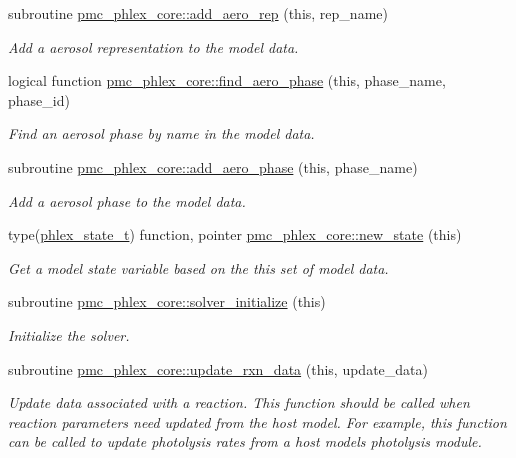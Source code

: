 \begin{DoxyCompactItemize}
subroutine \mbox{\hyperlink{namespacepmc__phlex__core_a7f01e1349e2d9387d646b46a676dcb78}{pmc\+\_\+phlex\+\_\+core\+::add\+\_\+aero\+\_\+rep}} (this, rep\+\_\+name)
\begin{DoxyCompactList}\small\item\em Add a aerosol representation to the model data. \end{DoxyCompactList}\item 
logical function \mbox{\hyperlink{namespacepmc__phlex__core_a3405caf8619aee5c8c8b485a7c4656c7}{pmc\+\_\+phlex\+\_\+core\+::find\+\_\+aero\+\_\+phase}} (this, phase\+\_\+name, phase\+\_\+id)
\begin{DoxyCompactList}\small\item\em Find an aerosol phase by name in the model data. \end{DoxyCompactList}\item 
subroutine \mbox{\hyperlink{namespacepmc__phlex__core_a0451072e828ba667d94da371f6651304}{pmc\+\_\+phlex\+\_\+core\+::add\+\_\+aero\+\_\+phase}} (this, phase\+\_\+name)
\begin{DoxyCompactList}\small\item\em Add a aerosol phase to the model data. \end{DoxyCompactList}\item 
type(\mbox{\hyperlink{structpmc__phlex__state_1_1phlex__state__t}{phlex\+\_\+state\+\_\+t}}) function, pointer \mbox{\hyperlink{namespacepmc__phlex__core_adffeba53035ef5016b6882ced639d412}{pmc\+\_\+phlex\+\_\+core\+::new\+\_\+state}} (this)
\begin{DoxyCompactList}\small\item\em Get a model state variable based on the this set of model data. \end{DoxyCompactList}\item 
subroutine \mbox{\hyperlink{namespacepmc__phlex__core_a9806ba5a2c2fec22d524fc375c55d03b}{pmc\+\_\+phlex\+\_\+core\+::solver\+\_\+initialize}} (this)
\begin{DoxyCompactList}\small\item\em Initialize the solver. \end{DoxyCompactList}\item 
subroutine \mbox{\hyperlink{namespacepmc__phlex__core_a18e09416ad550e977685ae0d76bf1f6a}{pmc\+\_\+phlex\+\_\+core\+::update\+\_\+rxn\+\_\+data}} (this, update\+\_\+data)
\begin{DoxyCompactList}\small\item\em Update data associated with a reaction. This function should be called when reaction parameters need updated from the host model. For example, this function can be called to update photolysis rates from a host model\textquotesingle{}s photolysis module. \end{DoxyCompactList}\item 

\end{DoxyCompactItemize}
